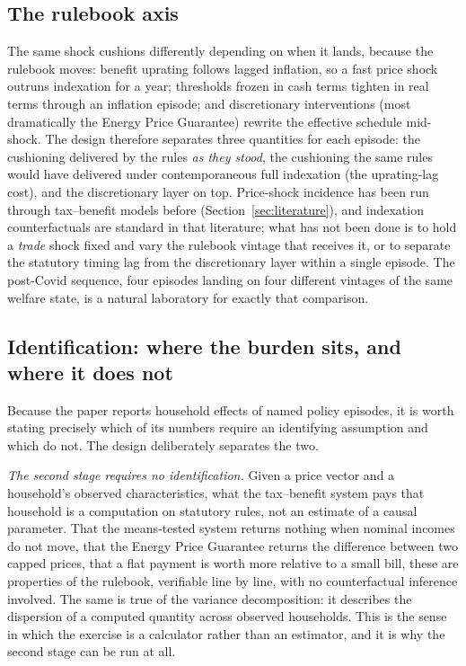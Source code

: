 \subsection{The rulebook axis}

The same shock cushions differently depending on when it lands, because
the rulebook moves: benefit uprating follows lagged inflation, so a
fast price shock outruns indexation for a year; thresholds frozen in
cash terms tighten in real terms through an inflation episode; and
discretionary interventions (most dramatically the Energy Price
Guarantee) rewrite the effective schedule mid-shock. The design
therefore separates three quantities for each episode: the cushioning
delivered by the rules \emph{as they stood}, the cushioning the same
rules would have delivered under contemporaneous full indexation (the
uprating-lag cost), and the discretionary layer on top. Price-shock incidence has been run through tax--benefit models before
(Section~\ref{sec:literature}), and indexation counterfactuals are
standard in that literature; what has not been done is to hold a
\emph{trade} shock fixed and vary the rulebook vintage that receives
it, or to separate the statutory timing lag from the discretionary
layer within a single episode. The post-Covid sequence, four episodes
landing on four different vintages of the same welfare state, is a
natural laboratory for exactly that comparison.

\subsection{Identification: where the burden sits, and where it does not}\label{sec:framework-ident}

Because the paper reports household effects of named policy episodes,
it is worth stating precisely which of its numbers require an
identifying assumption and which do not. The design deliberately
separates the two.

\emph{The second stage requires no identification.} Given a price
vector and a household's observed characteristics, what the tax--benefit
system pays that household is a computation on statutory rules, not an
estimate of a causal parameter. That the means-tested system returns
nothing when nominal incomes do not move, that the Energy Price
Guarantee returns the difference between two capped prices, that a flat
payment is worth more relative to a small bill, these are properties of
the rulebook, verifiable line by line, with no counterfactual inference
involved. The same is true of the variance decomposition: it describes
the dispersion of a computed quantity across observed households. This
is the sense in which the exercise is a calculator rather than an
estimator, and it is why the second stage can be run at all.

